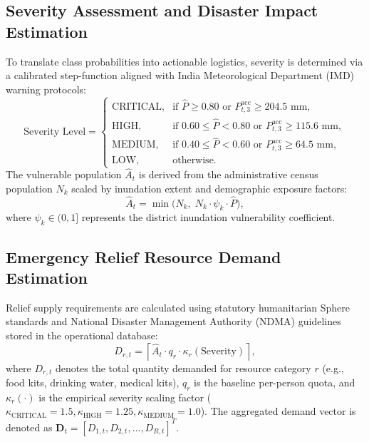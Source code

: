 \documentclass[conference]{IEEEtran}
\begin{document}
\subsection{Severity Assessment and Disaster Impact Estimation}
To translate class probabilities into actionable logistics, severity is determined via a calibrated step-function aligned with India Meteorological Department (IMD) warning protocols:
\begin{equation}
\text{Severity Level} = \begin{cases}
\text{CRITICAL}, & \text{if } \hat{P} \ge 0.80 \text{ or } P^{\text{acc}}_{t,3} \ge 204.5\text{ mm}, \\
\text{HIGH},     & \text{if } 0.60 \le \hat{P} < 0.80 \text{ or } P^{\text{acc}}_{t,3} \ge 115.6\text{ mm}, \\
\text{MEDIUM},   & \text{if } 0.40 \le \hat{P} < 0.60 \text{ or } P^{\text{acc}}_{t,3} \ge 64.5\text{ mm}, \\
\text{LOW},      & \text{otherwise}.
\end{cases}
\label{eq:severity_step}
\end{equation}
The vulnerable population $\hat{A}_t$ is derived from the administrative census population $N_k$ scaled by inundation extent and demographic exposure factors:
\begin{equation}
\hat{A}_t = \min\big( N_k, \; N_k \cdot \psi_k \cdot \hat{P} \big),
\label{eq:affected_pop}
\end{equation}
where $\psi_k \in (0, 1]$ represents the district inundation vulnerability coefficient.

\subsection{Emergency Relief Resource Demand Estimation}
Relief supply requirements are calculated using statutory humanitarian Sphere standards and National Disaster Management Authority (NDMA) guidelines stored in the operational database:
\begin{equation}
D_{r,t} = \left\lceil \hat{A}_t \cdot q_r \cdot \kappa_r(\text{Severity}) \right\rceil,
\label{eq:demand}
\end{equation}
where $D_{r,t}$ denotes the total quantity demanded for resource category $r$ (e.g., food kits, drinking water, medical kits), $q_r$ is the baseline per-person quota, and $\kappa_r(\cdot)$ is the empirical severity scaling factor ($\kappa_{\text{CRITICAL}} = 1.5, \kappa_{\text{HIGH}} = 1.25, \kappa_{\text{MEDIUM}} = 1.0$). The aggregated demand vector is denoted as $\mathbf{D}_t = [D_{1,t}, D_{2,t}, \dots, D_{R,t}]^T$.
\end{document}

